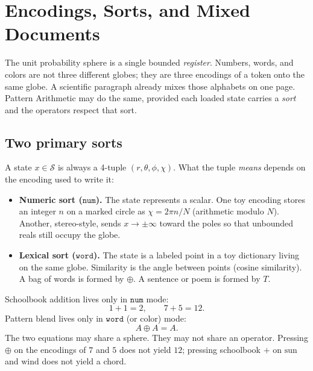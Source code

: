 \documentclass[12pt, a4paper]{article}
\begin{document}
\section{Encodings, Sorts, and Mixed Documents}
\label{sec:encodings_sorts}

The unit probability sphere is a single bounded \emph{register}.
Numbers, words, and colors are not three different globes; they are
three encodings of a token onto the same globe. A scientific paragraph
already mixes those alphabets on one page. Pattern Arithmetic may do
the same, provided each loaded state carries a \emph{sort} and the
operators respect that sort.

\subsection{Two primary sorts}
\label{subsec:sorts}
A state $x\in\mathcal{S}$ is always a 4-tuple
$(r,\theta,\phi,\chi)$. What the tuple \emph{means} depends on the
encoding used to write it:
\begin{itemize}
    \item \textbf{Numeric sort ($\mathtt{num}$).}
          The state represents a scalar. One toy encoding stores an
          integer $n$ on a marked circle as
          $\chi = 2\pi n/N$ (arithmetic modulo $N$).
          Another, stereo-style, sends $x\to\pm\infty$ toward the
          poles so that unbounded reals still occupy the globe.
    \item \textbf{Lexical sort ($\mathtt{word}$).}
          The state is a labeled point in a toy dictionary living on
          the same globe. Similarity is the angle between points
          (cosine similarity). A bag of words is formed by $\oplus$.
          A sentence or poem is formed by $T$.
\end{itemize}
Schoolbook addition lives only in $\mathtt{num}$ mode:
\begin{equation}
    1 + 1 = 2, \qquad 7 + 5 = 12.
\end{equation}
Pattern blend lives only in $\mathtt{word}$ (or color) mode:
\begin{equation}
    A \oplus A = A.
\end{equation}
The two equations may share a sphere. They may not share an operator.
Pressing $\oplus$ on the encodings of $7$ and $5$ does not yield $12$;
pressing schoolbook $+$ on $\mathrm{sun}$ and $\mathrm{wind}$ does not
yield a chord.
\end{document}
